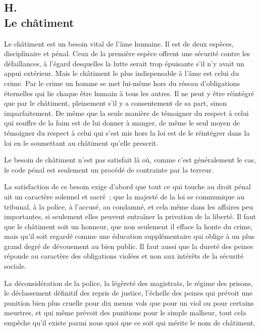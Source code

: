 \documentclass[french,twoside]{book} %
\begin{document}
\subsection[H. Le châtiment]{H. \\
Le châtiment}
\noindent \par
Le châtiment est un besoin vital de l'âme humaine. Il est de deux espèces, disciplinaire et pénal. Ceux de la première espèce offrent une sécurité contre les défaillances, à l'égard desquelles la lutte serait trop épuisante s'il n'y avait un appui extérieur. Mais le châtiment le plus indispensable à l'âme est celui du crime. Par le crime un homme se met lui-même hors du réseau d'obligations éternelles qui lie chaque être humain à tous les autres. Il ne peut y être réintégré que par le châtiment, pleinement s'il y a consentement de sa part, sinon imparfaitement. De même que la seule manière de témoigner du respect à celui qui souffre de la faim est de lui donner à manger, de même le seul moyen de témoigner du respect à celui qui s'est mis hors la loi est de le réintégrer dans la loi en le soumettant au châtiment qu'elle prescrit.\par
Le besoin de châtiment n'est pas satisfait là où, comme c'est généralement le cas, le code pénal est seulement un procédé de contrainte par la terreur.\par
La satisfaction de ce besoin exige d'abord que tout ce qui touche au droit pénal ait un caractère solennel et sacré ; que la majesté de la loi se communique au tribunal, à la police, à l'accusé, au condamné, et cela même dans les affaires peu importantes, si seulement elles peuvent entraîner la privation de la liberté. Il faut que le châtiment soit un honneur, que non seulement il efface la honte du crime, mais qu'il soit regardé comme une éducation supplémentaire qui oblige à un plus grand degré de dévouement au bien public. Il faut aussi que la dureté des peines réponde au caractère des obligations violées et non aux intérêts de la sécurité sociale.\par
La déconsidération de la police, la légèreté des magistrats, le régime des prisons, le déclassement définitif des repris de justice, l'échelle des peines qui prévoit une punition bien plus cruelle pour dix menus vols que pour un viol ou pour certains meurtres, et qui même prévoit des punitions pour le simple malheur, tout cela empêche qu'il existe parmi nous quoi que ce soit qui mérite le nom de châtiment.\par
\end{document}
